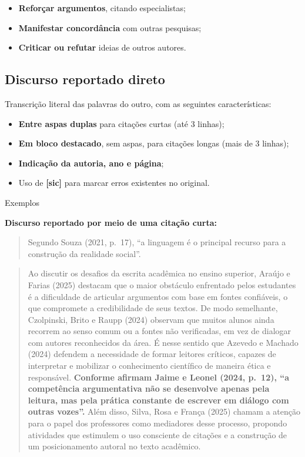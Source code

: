 \documentclass[
  letterpaper,
  DIV=11,
  numbers=noendperiod]{scrreprt}
\providecommand{\tightlist}{%
  \setlength{\itemsep}{0pt}\setlength{\parskip}{0pt}}
\begin{document}
\begin{itemize}
\tightlist
\item
  \textbf{Reforçar argumentos}, citando especialistas;
\item
  \textbf{Manifestar concordância} com outras pesquisas;
\item
  \textbf{Criticar ou refutar} ideias de outros autores.
\end{itemize}

\subsection{Discurso reportado direto}\label{discurso-reportado-direto}

Transcrição literal das palavras do outro, com as seguintes
características:

\begin{itemize}
\tightlist
\item
  \textbf{Entre aspas duplas} para citações curtas (até 3 linhas);
\item
  \textbf{Em bloco destacado}, sem aspas, para citações longas (mais de
  3 linhas);
\item
  \textbf{Indicação da autoria, ano e página};
\item
  Uso de \textbf{{[}sic{]}} para marcar erros existentes no original.
\end{itemize}

Exemplos

\textbf{Discurso reportado por meio de uma citação curta:}

\begin{quote}
Segundo Souza (2021, p.~17), ``a linguagem é o principal recurso para a
construção da realidade social''.
\end{quote}

\begin{quote}
Ao discutir os desafios da escrita acadêmica no ensino superior, Araújo
e Farias (2025) destacam que o maior obstáculo enfrentado pelos
estudantes é a dificuldade de articular argumentos com base em fontes
confiáveis, o que compromete a credibilidade de seus textos. De modo
semelhante, Czolpinski, Brito e Raupp (2024) observam que muitos alunos
ainda recorrem ao senso comum ou a fontes não verificadas, em vez de
dialogar com autores reconhecidos da área. É nesse sentido que Azevedo e
Machado (2024) defendem a necessidade de formar leitores críticos,
capazes de interpretar e mobilizar o conhecimento científico de maneira
ética e responsável. \textbf{Conforme afirmam Jaime e Leonel (2024,
p.~12), ``a competência argumentativa não se desenvolve apenas pela
leitura, mas pela prática constante de escrever em diálogo com outras
vozes''.} Além disso, Silva, Rosa e França (2025) chamam a atenção para
o papel dos professores como mediadores desse processo, propondo
atividades que estimulem o uso consciente de citações e a construção de
um posicionamento autoral no texto acadêmico.
\end{quote}
\end{document}
